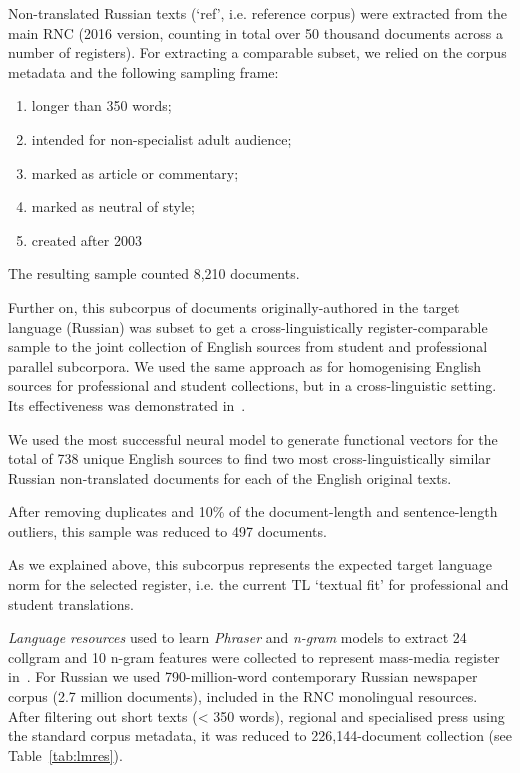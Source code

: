 Non-translated Russian texts (`ref', i.e. reference corpus) were extracted from the main \gls{RNC} (2016 version, counting in total over 50 thousand documents across a number of registers). For extracting a comparable subset, we relied on the corpus metadata and the following sampling frame:

\begin{enumerate}\compresslist{}
	\item longer than 350 words;
	\item intended for non-specialist adult audience;
	\item marked as article or commentary;
	\item marked as neutral of style;
	\item created after 2003
\end{enumerate}

The resulting sample counted 8,210 documents.

Further on, this subcorpus of documents originally-authored in the target language (Russian) was subset to get a cross-linguistically register-comparable sample to the joint collection of English sources from student and professional parallel subcorpora. We used the same approach as for homogenising English sources for professional and student collections, but in a cross-linguistic setting. Its effectiveness was demonstrated in~\citet{Kunilovskaya2019crossling}.

We used the most successful neural model to generate functional vectors for the total of 738 unique English sources to find two most cross-linguistically similar Russian non-translated documents for each of the English original texts. 

After removing duplicates and 10\% of the document-length and sentence-length outliers, this sample was reduced to 497 documents. 

As we explained above, this subcorpus represents the expected target language norm for the selected register, i.e. the current TL `textual fit' for professional and student translations.

\textit{Language resources} used to learn \textit{Phraser} and \textit{n-gram} models to extract 24 collgram and 10 n-gram features were collected to represent mass-media register in~\citet{Kunilovskaya2021regs}.
For Russian we used 790-million-word contemporary Russian newspaper corpus (2.7 million documents), included in the RNC monolingual resources. After filtering out short texts (< 350 words), regional and specialised press using the standard corpus metadata, it was reduced to 226,144-document collection (see Table~\ref{tab:lmres}).
 
